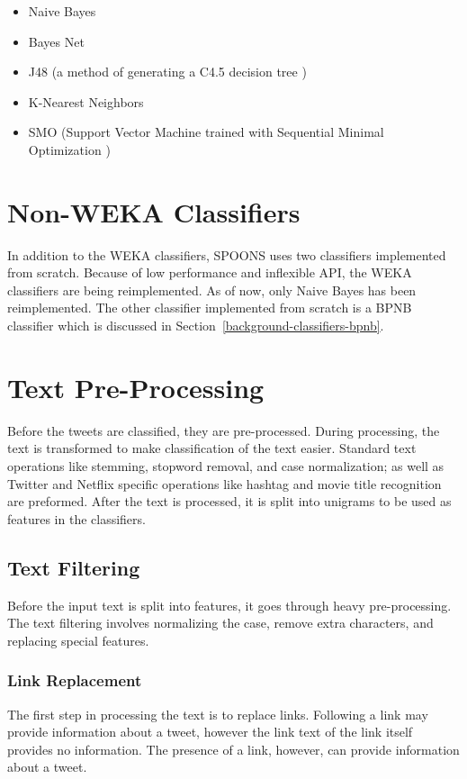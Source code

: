 \documentclass[12pt]{ucthesis}
\begin{document}
\begin{itemize}
   \item Naive Bayes
   \item Bayes Net
   \item J48 (a method of generating a C4.5 decision tree \cite{j48})
   \item K-Nearest Neighbors
   \item SMO (Support Vector Machine trained with Sequential Minimal Optimization \cite{smo})
\end{itemize}

\section{Non-WEKA Classifiers}
\label{class-nonweka}
In addition to the WEKA classifiers, SPOONS uses two classifiers implemented from scratch.
Because of low performance and inflexible API, the WEKA classifiers are being reimplemented.
As of now, only Naive Bayes has been reimplemented. The other classifier implemented from scratch is
a BPNB classifier which is discussed in Section~\ref{background-classifiers-bpnb}.

\section{Text Pre-Processing}
\label{class-processing}
Before the tweets are classified, they are pre-processed. During processing, the text is transformed
to make classification of the text easier. Standard text operations like stemming, stopword removal,
and case normalization; as well as Twitter and Netflix specific operations like hashtag and movie title
recognition are preformed. After the text is processed, it is split into unigrams to be used as features
in the classifiers.

\subsection{Text Filtering}
\label{class-filter}
Before the input text is split into features, it goes through heavy pre-processing.
The text filtering involves normalizing the case, remove extra characters, and replacing special features.

\subsubsection{Link Replacement}
\label{class-filter-link-replacement}
The first step in processing the text is to replace links.
Following a link may provide information about a tweet, however the link text of the link
itself provides no information. The presence of a link, however, can provide information about
a tweet.
\end{document}
